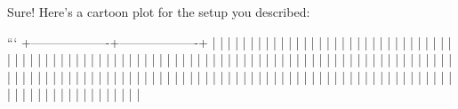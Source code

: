 Sure! Here's a cartoon plot for the setup you described:

```
  +-------------------+-------------------+
  |                   |                   |
  |                   |                   |
  |                   |                   |
  |                   |                   |
  |                   |                   |
  |                   |                   |
  |                   |                   |
  |                   |                   |
  |                   |                   |
  |                   |                   |
  |                   |                   |
  |                   |                   |
  |                   |                   |
  |                   |                   |
  |                   |                   |
  |                   |                   |
  |                   |                   |
  |                   |                   |
  |                   |                   |
  |                   |                   |
  |                   |                   |
  |                   |                   |
  |                   |                   |
  |                   |                   |
  |                   |                   |
  |                   |                   |
  |                   |                   |
  |                   |                   |
  |                   |                   |
  |                   |                   |
  |                   |                   |
  |                   |                   |
  |                   |                   |
  |                   |                   |
  |                   |                   |
  |                   |                   |
  |                   |                   |
  |                   |                   |
  |                   |                   |
  |                   |                   |
  |                   |                   |
  |                   |                   |
  |                   |                   |
  |                   |                   |
  |                   |                   |
  |                   |                   |
  |                   |                   |
  |                   |                   |
  |                   |                   |
  |                   |                   |
  |                   |                   |
  |                   |                   |
  |                   |                   |
  |                   |                   |
  |                   |                   |
  |                   |                   |
